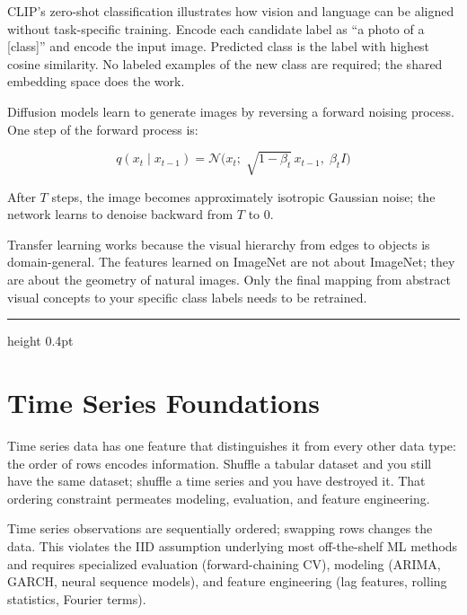 \documentclass[12pt,a4paper]{article}
\begin{document}
\begin{analogy}
CLIP's zero-shot classification illustrates how vision and language can
be aligned without task-specific training. Encode each candidate label
as ``a photo of a [class]'' and encode the input image. Predicted class
is the label with highest cosine similarity. No labeled examples of the
new class are required; the shared embedding space does the work.
\end{analogy}

Diffusion models learn to generate images by reversing a forward noising
process. One step of the forward process is:

\begin{equation*}
  q(x_t \mid x_{t-1})
  = \mathcal{N}\!\bigl(x_t;\;
    \sqrt{1-\beta_t}\,x_{t-1},\;
    \beta_t I\bigr)
\end{equation*}

After $T$ steps, the image becomes approximately isotropic Gaussian noise;
the network learns to denoise backward from $T$ to $0$.

\begin{mentalmodel}
Transfer learning works because the visual hierarchy from edges to objects
is domain-general. The features learned on ImageNet are not about
ImageNet; they are about the geometry of natural images. Only the final
mapping from abstract visual concepts to your specific class labels needs
to be retrained.
\end{mentalmodel}

\vspace{10pt}\hrule height 0.4pt\vspace{14pt}

\section*{Time Series Foundations}

Time series data has one feature that distinguishes it from every other
data type: the order of rows encodes information. Shuffle a tabular dataset
and you still have the same dataset; shuffle a time series and you have
destroyed it. That ordering constraint permeates modeling, evaluation,
and feature engineering.

\begin{concept}
Time series observations are sequentially ordered; swapping rows changes
the data. This violates the IID assumption underlying most off-the-shelf
ML methods and requires specialized evaluation (forward-chaining CV),
modeling (ARIMA, GARCH, neural sequence models), and feature engineering
(lag features, rolling statistics, Fourier terms).
\end{concept}
\end{document}
